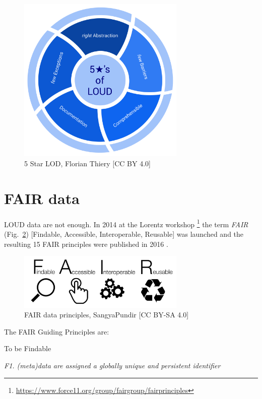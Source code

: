 \documentclass[twocolumn]{autart}
\begin{document}
\begin{figure}[!htb]
\begin{center}
\includegraphics[width=8cm]{5_Star_LOUD.png}
\caption{5 Star LOD, Florian Thiery [CC BY 4.0]}
\label{loud}
\end{center}
\end{figure}

\section{FAIR data}

LOUD data are not enough. In 2014 at the Lorentz workshop \footnote{\url{https://www.force11.org/group/fairgroup/fairprinciples}} the term \textit{FAIR} (Fig.~\ref{fair}) [Findable, Accessible, Interoperable, Reusable] was launched and the resulting 15 FAIR principles were published\cite{wilkinson_fair_2016} in 2016 \cite{force11_fair_2016}.

\begin{figure}[!htb]
\begin{center}
\includegraphics[width=8cm]{FAIR_data_principles.jpg}
\caption{FAIR data principles, SangyaPundir [CC BY-SA 4.0]}
\label{fair}
\end{center}
\end{figure}

The FAIR Guiding Principles are\cite{wilkinson_fair_2016}:

To be Findable

\textit{F1. (meta)data are assigned a globally unique and persistent identifier}
\end{document}
